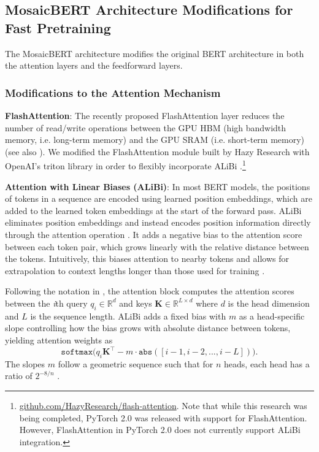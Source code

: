 \documentclass{article}
\begin{document}






\subsection{MosaicBERT Architecture Modifications for Fast Pretraining}

The MosaicBERT architecture modifies the original BERT architecture in both the attention layers and the feedforward layers.

\subsubsection{Modifications to the Attention Mechanism}
\textbf{FlashAttention}: The recently proposed FlashAttention layer reduces the number of read/write operations between the GPU HBM (high bandwidth memory, i.e. long-term memory) and the GPU SRAM (i.e. short-term memory) \citep{dao2022flashattention} (see also \citep{rabe2021self}). We modified the FlashAttention module built by Hazy Research with OpenAI’s triton library in order to flexibly incorporate ALiBi \citep{tillet2019triton}.\footnote{\href{https://github.com/HazyResearch/flash-attention}{\url{github.com/HazyResearch/flash-attention}}. Note that while this research was being completed, PyTorch 2.0 was released with support for FlashAttention. However, FlashAttention in PyTorch 2.0 does not currently support ALiBi integration.}


\textbf{Attention with Linear Biases (ALiBi)}:  In most BERT models, the positions of tokens in a sequence are encoded using learned position embeddings, which are added to the learned token embeddings at the start of the forward pass. ALiBi eliminates position embeddings and instead encodes position information directly through the attention operation \citep{press2021train}. It adds a negative bias to the attention score between each token pair, which grows linearly with the relative distance between the tokens. Intuitively, this biases attention to nearby tokens and allows for extrapolation to context lengths longer than those used for training \citep{press2021train}.

Following the notation in \cite{press2021train}, the attention block computes the attention scores between the \textit{i}th query $q_i \in \mathbb{R}^{d}$ and keys $\mathbf{K} \in \mathbb{R}^{L \times d}$ where $d$ is the head dimension and $L$ is the sequence length. ALiBi adds a fixed bias with $m$ as a head-specific slope controlling how the bias grows with absolute distance between tokens, yielding attention weights as
\begin{equation}
    \texttt{softmax}\big(q_i \mathbf{K}^\top - m \cdot \texttt{abs}([i-1, i-2, ..., i-L])\big).
\end{equation}
The slopes $m$ follow a geometric sequence such that for $n$ heads, each head has a ratio of $2^{-8/n}$ \citep{press2021train}. 
\end{document}
